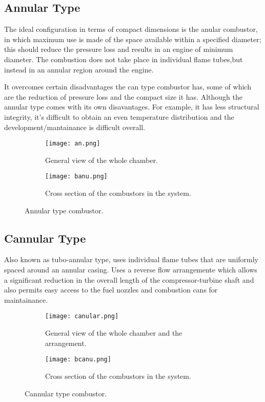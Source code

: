 \documentclass[12pt, letterpaper]{article}
\begin{document}
\subsection*{Annular Type}
The ideal configuration in terms of compact dimensions is the anular combustor, in which maximum use is made of the space available within a specified diameter; this should reduce the pressure loss and results in an engine of minimum diameter. The combustion does not take place in individual flame tubes,but instead in an annular region around the engine.

It overcomes certain disadvantages the can type combustor has, some of which are the reduction of pressure loss and the compact size it has. Although the annular type comes with its own disavantages. For example, it has less structural integrity, it's difficult to obtain an even temperature distribution and the development/mantainance is difficult overall.

\begin{figure}[H]
	\centering
	\begin{subfigure}[b]{0.49\linewidth}
		\texttt{[image: an.png]}
		\caption{General view of the whole chamber.}
	\end{subfigure}
	\begin{subfigure}[b]{0.49\linewidth}
		\texttt{[image: banu.png]}
		\caption{Cross section of the combustors in the system.}
	\end{subfigure}
	\caption{Annular type combustor.}
\end{figure}

\subsection*{Cannular Type}
Also known as tubo-annular type, uses individual flame tubes that are uniformly spaced around an annular casing. Uses a reverse flow arrangemente which allows a significant reduction in the overall length of the compressor-turbine shaft and also permits easy access to the fuel nozzles and combustion cans for maintainance.\autocite{rset}

\begin{figure}[H]
	\centering
	\begin{subfigure}[b]{0.49\linewidth}
		\texttt{[image: canular.png]}
		\caption{General view of the whole chamber and the arrangement.}
	\end{subfigure}
	\begin{subfigure}[b]{0.49\linewidth}
		\texttt{[image: bcanu.png]}
		\caption{Cross section of the combustors in the system.}
	\end{subfigure}
	\caption{Cannular type combustor.}
\end{figure}
\renewcommand\refname{References}
\printbibliography
\end{document}
